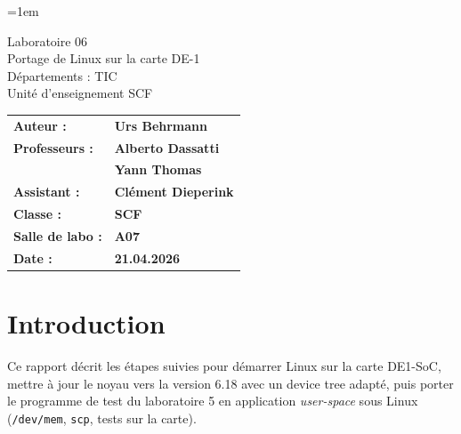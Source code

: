 \documentclass[a4paper,12pt]{article}
\author{Urs Behrmann}
\begin{document}
\emergencystretch=1em %

\thispagestyle{firstpage}


\vspace*{2cm}
\begin{center}
    \Huge Laboratoire 06 \\
    \vspace{0.2cm}
    \Large Portage de Linux sur la carte DE-1\\
    \vspace{1cm}
    \small Départements : TIC\\
    Unité d'enseignement SCF\\
\end{center}

\vspace{9cm}

\renewcommand{\arraystretch}{1.5} %

\begin{flushleft} %
    \begin{tabular}{@{}l l@{}}
        \textbf{Auteur :}        & \textbf{Urs Behrmann} \\
        \textbf{Professeurs :}   & \textbf{Alberto Dassatti} \\
                                 & \textbf{Yann Thomas} \\
        \textbf{Assistant :}     & \textbf{Clément Dieperink} \\
        \textbf{Classe :}        & \textbf{SCF} \\
        \textbf{Salle de labo :} & \textbf{A07} \\
        \textbf{Date :}          & \textbf{21.04.2026} \\
    \end{tabular}
\end{flushleft}

\newpage

\pagestyle{otherpages}

\renewcommand{\contentsname}{Table des matières}
\tableofcontents

\newpage

\section{Introduction}

Ce rapport décrit les étapes suivies pour démarrer Linux sur la carte DE1-SoC, mettre à jour le noyau vers la version 6.18 avec un device tree adapté, puis porter le programme de test du laboratoire 5 en application \emph{user-space} sous Linux (\texttt{/dev/mem}, \texttt{scp}, tests sur la carte).
\end{document}
